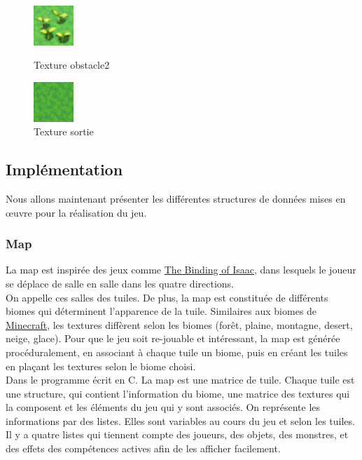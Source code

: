 \documentclass[11pt]{article}
\begin{document}
            \begin{figure}[H]
                \centering
                \begin{minipage}{0.45\textwidth}
                    \centering
                    \includegraphics[height=1.5cm]{obstacle2.png}
                    \caption{Texture obstacle2}
                    \label{fig:obstacle2}
                \end{minipage}
                \hfill
                \begin{minipage}{0.45\textwidth}
                    \centering
                    \includegraphics[height=1.5cm]{sortie.png}
                    \caption{Texture sortie}
                    \label{fig:sortie}
                \end{minipage}
            \end{figure}

        \subsection{Implémentation}
        Nous allons maintenant présenter les différentes structures de données mises en œuvre pour la réalisation du jeu.
            \subsubsection{Map}
            La map est inspirée des jeux comme \href{https://en.wikipedia.org/wiki/The_Binding_of_Isaac_(video_game)}{The Binding of Isaac}, 
            dans lesquels le joueur se déplace de salle en salle dans les quatre directions. \\
            On appelle ces salles des tuiles. De plus, la map est constituée de différents biomes qui déterminent l'apparence de la tuile. Similaires aux biomes de \href{https://fr.wikipedia.org/wiki/Minecraft}{Minecraft},
            les textures diffèrent selon les biomes (forêt, plaine, montagne, desert, neige, glace).
            Pour que le jeu soit re-jouable et intéressant, la map est générée procéduralement, en associant à chaque tuile un biome, 
            puis en créant les tuiles en plaçant les textures selon le biome choisi.\\
            Dans le programme écrit en C. La map est une matrice de tuile. Chaque tuile est une structure, qui contient l'information du biome, 
            une matrice des textures qui la composent et les éléments du jeu qui y sont associés.
            On représente les informations par des listes. Elles sont variables au cours du jeu et selon les tuiles. 
            Il y a quatre listes qui tiennent compte des joueurs, des objets, des monstres, et des effets des compétences actives afin de les afficher facilement.
\end{document}
